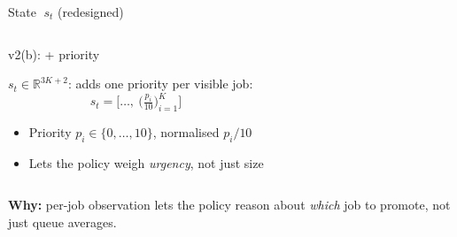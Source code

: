 \begin{frame}{State $\;s_t$ \hfill \small\textcolor{SoftCoral}{(redesigned)}}
\begin{columns}[T,onlytextwidth]
    \hfill
      \begin{block}{v2(b): + priority}
        \begin{minipage}[t][4.0cm]{\linewidth}
        \begin{minipage}[t][2.0cm]{\linewidth}
        $s_t \in \mathbb{R}^{3K+2}$: adds one priority per visible job:
        $$
          s_t = \Big[\dots,\ \big(\tfrac{p_i}{10}\big)_{i=1}^{K}\Big]
        $$
        \end{minipage}
        \begin{itemize}\setlength\itemsep{3pt}
          \item Priority $p_i \in \{0,\dots,10\}$, normalised $p_i/10$
          \item Lets the policy weigh \emph{urgency}, not just size
        \end{itemize}
        \end{minipage}
      \end{block}
  \end{columns}

  \vspace{0.8em}
  \centering
  \small\textcolor{DeepBlue}{\textbf{Why:}} per-job observation lets the policy reason about \emph{which} job to promote, not just queue averages.
\end{frame}

